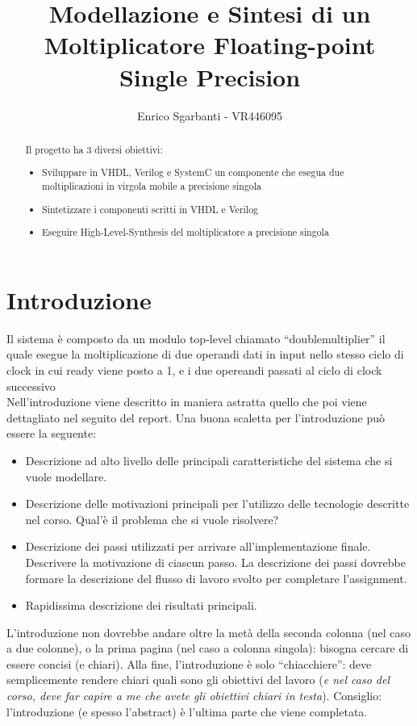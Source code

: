 \documentclass[]{IEEEtran}
\title{Modellazione e Sintesi di un Moltiplicatore Floating-point Single Precision}
\author{Enrico Sgarbanti - VR446095}
\begin{document}
\maketitle

\begin{abstract}
Il progetto ha 3 diversi obiettivi:
\begin{itemize}
\item Sviluppare in VHDL, Verilog e SystemC un componente che esegua due moltiplicazioni in virgola mobile a precisione singola
\item Sintetizzare i componenti scritti in VHDL e Verilog
\item Eseguire High-Level-Synthesis del moltiplicatore a precisione singola
\end{itemize}
\end{abstract}


\section{Introduzione}
Il sistema è composto da un modulo top-level chiamato ``double\textunderscore multiplier'' il quale esegue la moltiplicazione di due operandi dati in input nello stesso ciclo di clock in cui ready viene posto a 1, e i due opereandi passati al ciclo di clock successivo
\\

Nell'introduzione viene descritto in maniera astratta quello che poi viene dettagliato nel seguito del report. Una buona scaletta per l'introduzione pu\`o essere la seguente:
\begin{itemize}
\item Descrizione ad alto livello delle principali caratteristiche del sistema che si vuole modellare.
\item Descrizione delle motivazioni principali per l'utilizzo delle tecnologie descritte nel corso. Qual'\`e il problema che si vuole risolvere?
\item Descrizione dei passi utilizzati per arrivare all'implementazione finale. Descrivere la motivazione di ciascun passo. La descrizione dei passi dovrebbe formare la descrizione del flusso di lavoro svolto per completare l'assignment.
\item Rapidissima descrizione dei risultati principali.
\end{itemize}

L'introduzione non dovrebbe andare oltre la met\`a della seconda colonna (nel caso a due colonne), o la prima pagina (nel caso a colonna singola): bisogna cercare di essere concisi (e chiari). Alla fine, l'introduzione \`e solo ``chiacchiere'': deve semplicemente rendere chiari quali sono gli obiettivi del lavoro (\emph{e nel caso del corso, deve far capire a me che avete gli obiettivi chiari in testa}). Consiglio: l'introduzione (e spesso l'abstract) \`e l'ultima parte che viene completata.
\end{document}
